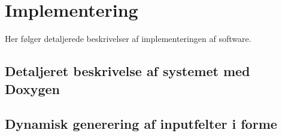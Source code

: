 \chapter{Implementering}

Her følger detaljerede beskrivelser af implementeringen af software.

\section{Detaljeret beskrivelse af systemet med Doxygen}
%


\section{Dynamisk generering af inputfelter i forme}


